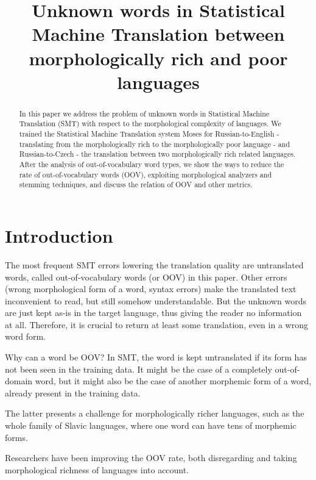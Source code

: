 \documentclass[11pt,letterpaper]{article}
\title{Unknown words in Statistical Machine Translation between morphologically
rich and poor languages}
\date{}
\begin{document}
\maketitle
\begin{abstract}
In this paper we address the problem of unknown words in Statistical
Machine Translation (SMT) with respect to the morphological complexity of languages. 
We trained the Statistical Machine Translation system Moses
for Russian-to-English - translating from the morphologically rich to the
morphologically poor language - and Russian-to-Czech - the translation
between two morphologically rich related languages. After the analysis of
out-of-vocabulary word types, we show the ways to reduce the rate of out-of-vocabulary words (OOV), 
exploiting morphological analyzers
and stemming techniques, and discuss the relation of OOV and other metrics.
\end{abstract}

\section{Introduction}
The most frequent SMT errors lowering the translation quality
are untranslated words, called out-of-vocabulary words (or OOV) in this paper. Other errors (wrong morphological form of a word, syntax errors) make the translated text inconvenient to read, but still somehow understandable. But the unknown words are just kept as-is in the target language, thus giving the reader no information at all. Therefore, it is crucial to return at least some translation, even in a wrong word form.

Why can a word be OOV? In SMT, the word is kept untranslated if its form has not been seen in the training data. It might be the case of a completely out-of-domain word, but it might also be the case of another morphemic form of a word, already present in the training data. 

The latter presents a challenge for morphologically richer languages, such as the whole family of Slavic languages, where one word can have tens of morphemic forms.

Researchers have been improving the OOV rate, both disregarding and taking morphological richness of languages into account.
\end{document}
